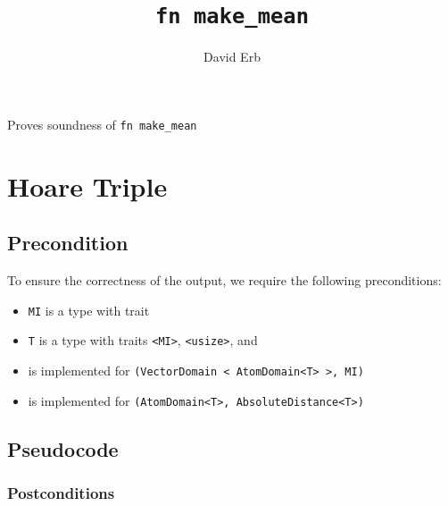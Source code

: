 \documentclass{article}
\title{\texttt{fn make\_mean}}
\author{David Erb}
\date{}
\begin{document}
\maketitle

Proves soundness of \texttt{fn make\_mean}


\section{Hoare Triple}
\subsection*{Precondition}
To ensure the correctness of the output, we require the following preconditions:

\begin{itemize}
    \item \texttt{MI} is a type with trait 
    \item \texttt{T} is a type with traits \texttt{<MI>}, \texttt{<usize>},  and 
    \item {} is implemented for \texttt{(VectorDomain < AtomDomain<T> >, MI)}
    \item {} is implemented for \texttt{(AtomDomain<T>, AbsoluteDistance<T>)}
\end{itemize}

\subsection*{Pseudocode}


\subsubsection*{Postconditions}
\end{document}
